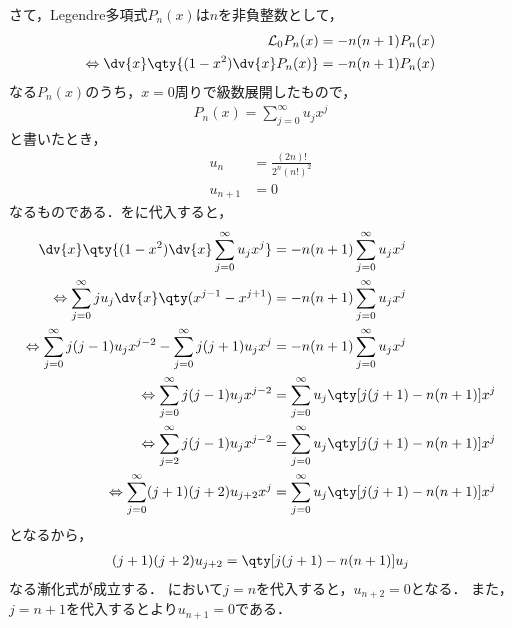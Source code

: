 \documentclass{report}
\begin{document}
      さて，Legendre多項式$P_n(x)$は$n$を非負整数として，
      \begin{align}
        \mathcal{L}_0P_n(x) &= -n(n + 1) P_n(x) \\ 
        \Leftrightarrow \dv{x}\qty{(1 - x^2)\dv{x}P_n(x)} &= -n(n + 1)P_n(x)\label{legendre-polynominal} 
      \end{align}
      なる$P_n(x)$のうち，$x = 0$周りで級数展開したもので，
      \begin{align}
        P_n(x) = \sum_{j = 0}^{\infty}u_jx^j\label{legendre-polynominal-u-expantion}
      \end{align}
      と書いたとき，
      \begin{align}
        u_n &= \frac{(2n)!}{2^n(n!)^2}\label{legendre-polynominal-u-expantion-n} \\ 
        u_{n + 1} &= 0\label{legendre-polynominal-u-expantion-np1}
      \end{align}
      なるものである．をに代入すると，
      \begin{align}
        \dv{x}\qty{(1 - x^2)\dv{x}\sum_{j = 0}^{\infty}u_jx^j} &= -n(n + 1)\sum_{j = 0}^{\infty}u_jx^j \\ 
        \Leftrightarrow \sum_{j = 0}^{\infty}ju_j\dv{x}\qty(x^{j - 1} - x^{j + 1}) &= -n(n + 1)\sum_{j = 0}^{\infty}u_jx^j \\ 
        \Leftrightarrow \sum_{j = 0}^{\infty}j(j - 1)u_jx^{j - 2} - \sum_{j = 0}^{\infty}j(j + 1)u_jx^j &= -n(n + 1)\sum_{j = 0}^{\infty}u_jx^j \\ 
        \Leftrightarrow \sum_{j = 0}^{\infty}j(j - 1)u_jx^{j - 2} &= \sum_{j = 0}^{\infty}u_j\qty[j(j + 1) - n(n + 1)]x^j \\ 
        \Leftrightarrow \sum_{j = 2}^{\infty}j(j - 1)u_jx^{j - 2} &= \sum_{j = 0}^{\infty}u_j\qty[j(j + 1) - n(n + 1)]x^j \\ 
        \Leftrightarrow \sum_{j = 0}^{\infty}(j + 1)(j + 2)u_{j + 2}x^{j} &= \sum_{j = 0}^{\infty}u_j\qty[j(j + 1) - n(n + 1)]x^j 
      \end{align}
      となるから，
      \begin{align}
        (j + 1)(j + 2)u_{j + 2} = \qty[j(j + 1) - n(n + 1)]u_j\label{legendre-polynominal-u-expantion-recurr}
      \end{align}
      なる漸化式が成立する．
      において$j = n$を代入すると，$u_{n + 2} = 0$となる．
      また，$j = n + 1$を代入するとより$u_{n + 1} = 0$である．
\end{document}
